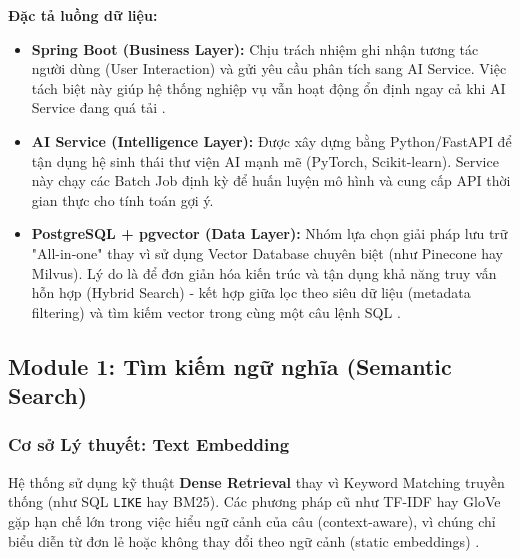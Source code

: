 \textbf{Đặc tả luồng dữ liệu:}
\begin{itemize}
    \item \textbf{Spring Boot (Business Layer):} Chịu trách nhiệm ghi nhận tương tác người dùng (User Interaction) và gửi yêu cầu phân tích sang AI Service. Việc tách biệt này giúp hệ thống nghiệp vụ vẫn hoạt động ổn định ngay cả khi AI Service đang quá tải \cite{nhatthanh2025cleanblog}.
    \item \textbf{AI Service (Intelligence Layer):} Được xây dựng bằng Python/FastAPI để tận dụng hệ sinh thái thư viện AI mạnh mẽ (PyTorch, Scikit-learn). Service này chạy các Batch Job định kỳ để huấn luyện mô hình và cung cấp API thời gian thực cho tính toán gợi ý.
    \item \textbf{PostgreSQL + pgvector (Data Layer):} Nhóm lựa chọn giải pháp lưu trữ "All-in-one" thay vì sử dụng Vector Database chuyên biệt (như Pinecone hay Milvus). Lý do là để đơn giản hóa kiến trúc và tận dụng khả năng truy vấn hỗn hợp (Hybrid Search) - kết hợp giữa lọc theo siêu dữ liệu (metadata filtering) và tìm kiếm vector trong cùng một câu lệnh SQL \cite{pgvector_docs}.
\end{itemize}

\subsection{Module 1: Tìm kiếm ngữ nghĩa (Semantic Search)} 
\subsubsection{Cơ sở Lý thuyết: Text Embedding}
Hệ thống sử dụng kỹ thuật \textbf{Dense Retrieval} thay vì Keyword Matching truyền thống (như SQL \texttt{LIKE} hay BM25). Các phương pháp cũ như TF-IDF hay GloVe \cite{Pennington2014GloVe} gặp hạn chế lớn trong việc hiểu ngữ cảnh của câu (context-aware), vì chúng chỉ biểu diễn từ đơn lẻ hoặc không thay đổi theo ngữ cảnh (static embeddings) \cite{Mikolov2013Efficient}.

